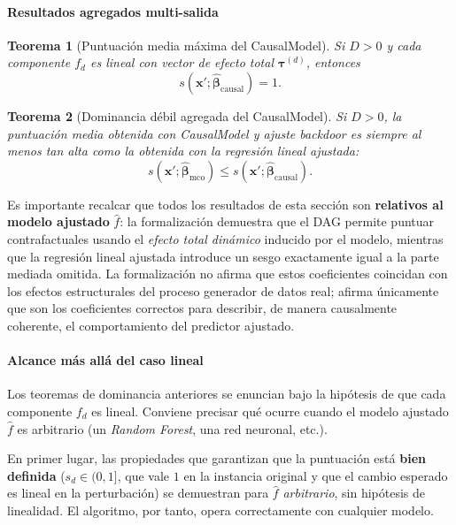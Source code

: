 \documentclass[12pt]{report} %
\newtheorem{theorem}{Teorema}
\begin{document}
\paragraph{Resultados agregados multi-salida}

\begin{theorem}[Puntuación media máxima del CausalModel]
    Si $D > 0$ y cada componente $f_d$ es lineal con vector de efecto total $\boldsymbol{\tau}^{(d)}$, entonces
    $$s\!\left(\mathbf{x}'; \widehat{\boldsymbol{\beta}}_{\text{causal}}\right) = 1.$$
\end{theorem}

\begin{theorem}[Dominancia débil agregada del CausalModel]
    Si $D > 0$, la puntuación media obtenida con CausalModel y ajuste \textit{backdoor} es siempre al menos tan alta como la obtenida con la regresión lineal ajustada:
    $$s\!\left(\mathbf{x}'; \widehat{\boldsymbol{\beta}}_{\text{mco}}\right) \leq s\!\left(\mathbf{x}'; \widehat{\boldsymbol{\beta}}_{\text{causal}}\right).$$
\end{theorem}

Es importante recalcar que todos los resultados de esta sección son \textbf{relativos al modelo ajustado} $\hat{f}$: la formalización demuestra que el DAG permite puntuar contrafactuales usando el \emph{efecto total dinámico} inducido por el modelo, mientras que la regresión lineal ajustada introduce un sesgo exactamente igual a la parte mediada omitida. La formalización no afirma que estos coeficientes coincidan con los efectos estructurales del proceso generador de datos real; afirma únicamente que son los coeficientes correctos para describir, de manera causalmente coherente, el comportamiento del predictor ajustado.

\paragraph{Alcance más allá del caso lineal}

Los teoremas de dominancia anteriores se enuncian bajo la hipótesis de que cada componente $f_d$ es lineal. Conviene precisar qué ocurre cuando el modelo ajustado $\hat{f}$ es arbitrario (un \textit{Random Forest}, una red neuronal, etc.).

En primer lugar, las propiedades que garantizan que la puntuación está \textbf{bien definida} ($s_d \in (0, 1]$, que vale $1$ en la instancia original y que el cambio esperado es lineal en la perturbación) se demuestran para $\hat{f}$ \emph{arbitrario}, sin hipótesis de linealidad. El algoritmo, por tanto, opera correctamente con cualquier modelo.
\end{document}
